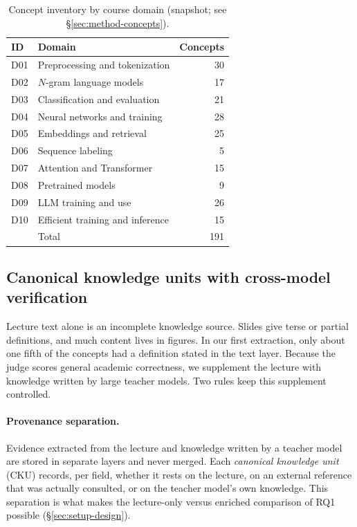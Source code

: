 \begin{table}[t]
\centering
\small
\begin{tabular}{llr}
\toprule
ID & Domain & Concepts \\
\midrule
D01 & Preprocessing and tokenization & 30 \\
D02 & $N$-gram language models & 17 \\
D03 & Classification and evaluation & 21 \\
D04 & Neural networks and training & 28 \\
D05 & Embeddings and retrieval & 25 \\
D06 & Sequence labeling & 5 \\
D07 & Attention and Transformer & 15 \\
D08 & Pretrained models & 9 \\
D09 & LLM training and use & 26 \\
D10 & Efficient training and inference & 15 \\
\midrule
 & Total & 191 \\
\bottomrule
\end{tabular}
\caption{Concept inventory by course domain (snapshot; see \S\ref{sec:method-concepts}).}
\label{tab:domains}
\end{table}

\subsection{Canonical knowledge units with cross-model verification}
\label{sec:method-cku}

Lecture text alone is an incomplete knowledge source.
Slides give terse or partial definitions, and much content lives in figures.
In our first extraction, only about one fifth of the concepts had a definition stated in the text layer.
Because the judge scores general academic correctness, we supplement the lecture with knowledge written by large teacher models.
Two rules keep this supplement controlled.

\paragraph{Provenance separation.}
Evidence extracted from the lecture and knowledge written by a teacher model are stored in separate layers and never merged.
Each \emph{canonical knowledge unit} (CKU) records, per field, whether it rests on the lecture, on an external reference that was actually consulted, or on the teacher model's own knowledge.
This separation is what makes the lecture-only versus enriched comparison of RQ1 possible (\S\ref{sec:setup-design}).

